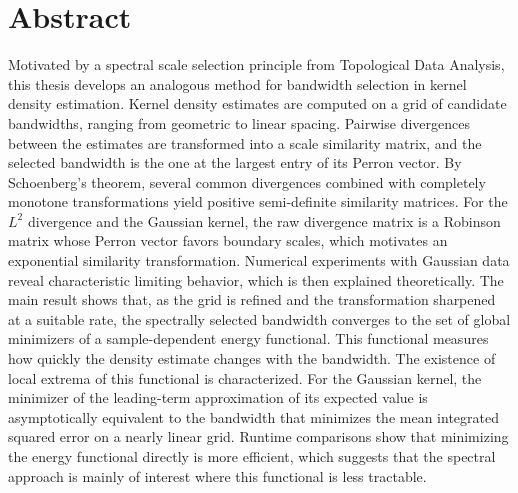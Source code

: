 \chapter*{Abstract}

Motivated by a spectral scale selection principle from Topological Data Analysis, this thesis develops an analogous method for bandwidth selection in kernel density estimation. Kernel density estimates are computed on a grid of candidate bandwidths, ranging from geometric to linear spacing. Pairwise divergences between the estimates are transformed into a scale similarity matrix, and the selected bandwidth is the one at the largest entry of its Perron vector. By Schoenberg's theorem, several common divergences combined with completely monotone transformations yield positive semi-definite similarity matrices. For the $L^2$ divergence and the Gaussian kernel, the raw divergence matrix is a Robinson matrix whose Perron vector favors boundary scales, which motivates an exponential similarity transformation. Numerical experiments with Gaussian data reveal characteristic limiting behavior, which is then explained theoretically. The main result shows that, as the grid is refined and the transformation sharpened at a suitable rate, the spectrally selected bandwidth converges to the set of global minimizers of a sample-dependent energy functional. This functional measures how quickly the density estimate changes with the bandwidth. The existence of local extrema of this functional is characterized. For the Gaussian kernel, the minimizer of the leading-term approximation of its expected value is asymptotically equivalent to the bandwidth that minimizes the mean integrated squared error on a nearly linear grid. Runtime comparisons show that minimizing the energy functional directly is more efficient, which suggests that the spectral approach is mainly of interest where this functional is less tractable.